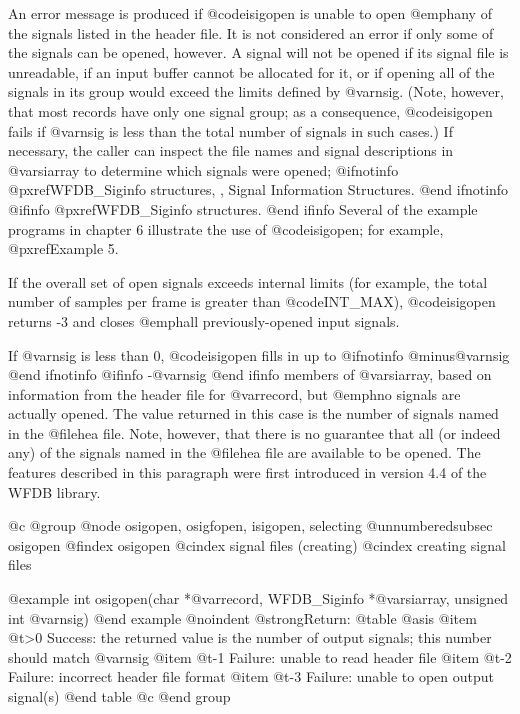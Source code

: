 {{{{{{{{An error message is produced if @code{isigopen} is unable to open
@emph{any} of the signals listed in the header file.  It is not
considered an error if only some of the signals can be opened, however.
A signal will not be opened if its signal file is unreadable, if an
input buffer cannot be allocated for it, or if opening all of the
signals in its group would exceed the limits defined by @var{nsig}.
(Note, however, that most records have only one signal group; as a
consequence, @code{isigopen} fails if @var{nsig} is less than the
total number of signals in such cases.)  If necessary, the caller can
inspect the file names and signal descriptions in @var{siarray} to
determine which signals were opened; 
@ifnotinfo
@pxref{WFDB_Siginfo structures, , Signal Information Structures}.
@end ifnotinfo
@ifinfo
@pxref{WFDB_Siginfo structures}.
@end ifinfo
Several of the example programs in chapter 6
illustrate the use of @code{isigopen}; for example, @pxref{Example
5}.

If the overall set of open signals exceeds internal limits (for example, the
total number of samples per frame is greater than @code{INT_MAX}),
@code{isigopen} returns -3 and closes @emph{all} previously-opened input
signals.

If @var{nsig} is less than 0, @code{isigopen} fills in up to
@ifnotinfo
@minus{}@var{nsig}
@end ifnotinfo
@ifinfo
-@var{nsig}
@end ifinfo
members of @var{siarray}, based on information from the header file
for @var{record}, but @emph{no signals are actually opened}.  The value
returned in this case is the number of signals named in the @file{hea} file.
Note, however, that there is no guarantee that all (or indeed any) of the
signals named in the @file{hea} file are available to be opened.
The features described in this paragraph were first introduced in
version 4.4 of the WFDB library.

@c @group
@node     osigopen, osigfopen, isigopen, selecting
@unnumberedsubsec osigopen
@findex osigopen
@cindex signal files (creating)
@cindex creating signal files

@example
int osigopen(char *@var{record}, WFDB_Siginfo *@var{siarray}, unsigned int @var{nsig})
@end example
@noindent
@strong{Return:}
@table @asis
@item @t{>0}
Success: the returned value is the number of output signals; this number
should match @var{nsig}
@item @t{-1}
Failure: unable to read header file
@item @t{-2}
Failure: incorrect header file format
@item @t{-3}
Failure: unable to open output signal(s)
@end table
@c @end group

}}}}}}}}

